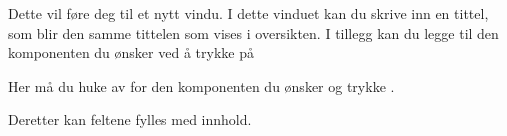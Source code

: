 Dette vil føre deg til et nytt vindu. I dette vinduet kan du skrive inn en tittel, som blir den samme tittelen som vises i oversikten. I tillegg kan du legge til den komponenten du ønsker ved å trykke på 

\begin{figure}[H]
    \centering
    \label{fig:cms-add-component}
\end{figure}

Her må du huke av for den komponenten du ønsker og trykke .

\begin{figure}[H]
    \centering
    \label{fig:cms-chose-component}
\end{figure}

Deretter kan feltene fylles med innhold.

